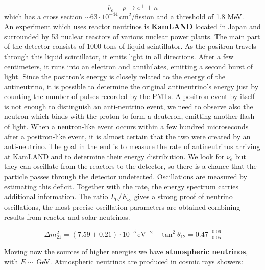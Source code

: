 \documentclass[10.75pt,a4paper,openright,bottom=2cm]{article}
\newcommand{\beginbox}[1]{\begin{tcolorbox}[width=\textwidth,colback={black!40},title={#1},colbacktitle={purple!55},coltitle=black]}
\renewcommand{\endbox}{\end{tcolorbox}\noindent}
\begin{document}
\[
\overline{\nu}_e+p\to e^++n
\]
which has a cross section $\sim63\cdot10^{-44}$\,cm$^2$/fission and a threshold of 1.8 MeV.\\
An experiment which uses reactor neutrinos is \textbf{KamLAND} located in Japan and surrounded by 53 nuclear reactors of various nuclear power plants. The main part of the detector consists of 1000 tons of liquid scintillator. As the positron travels through this liquid scintillator, it emits light in all directions. After a few centimeters, it runs into an electron and annihilates, emitting a second burst of light. Since the positron's energy is closely related to the energy of the antineutrino, it is possible to determine the original antineutrino's energy just by counting the number of pulses recorded by the PMTs. A positron event by itself is not enough to distinguish an anti-neutrino event, we need to observe also the neutron which binds with the proton to form a deuteron, emitting another flash of light. When a neutron-like event occurs within a few hundred microseconds after a positron-like event, it is almost certain that the two were created by an anti-neutrino. The goal in the end is to measure the rate of antineutrinos arriving at KamLAND and to determine their energy distribution. We look for $\overline{\nu}_e$ but they can oscillate from the reactors to the detector, so there is a chance that the particle passes through the detector undetected. Oscillations are measured by estimating this deficit. Together with the rate, the energy spectrum carries additional information. The ratio $L_0/E_{\overline{\nu}_e}$ gives a strong proof of neutrino oscillations, the most precise oscillation parameters are obtained combining results from reactor and solar neutrinos.\\
\beginbox{KamLAND Results}
\[
\Delta m^2_{21}=(7.59\pm0.21)\cdot10^{-5}\,\text{eV$^{-2}$} \quad \tan^2\theta_{12}=0.47^{+0.06}_{-0.05}
\]
\endbox
Moving now the sources of higher energies we have \textbf{atmospheric neutrinos}, with $E\sim$\,GeV. Atmospheric neutrinos are produced in cosmic rays showers:\\
\end{document}
